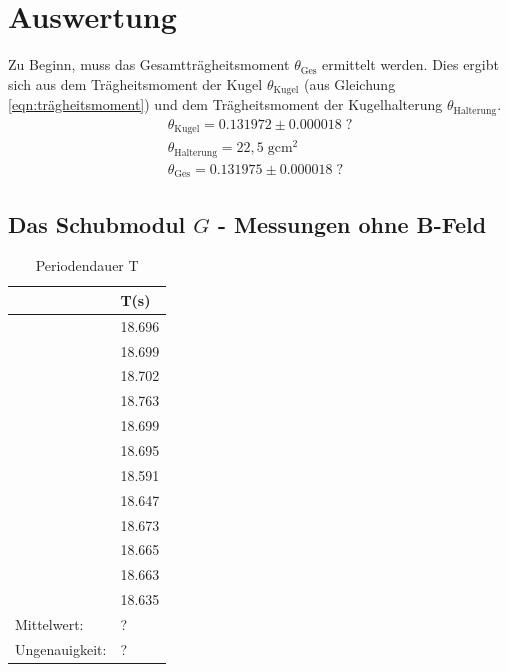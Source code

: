 
\newpage
\section{Auswertung}
Zu Beginn, muss das Gesamtträgheitsmoment $\theta_\text{Ges}$ ermittelt werden.
Dies ergibt sich aus dem Trägheitsmoment der Kugel $\theta_\text{Kugel}$ (aus Gleichung \ref{eqn:trägheitsmoment}) und
dem Trägheitsmoment der Kugelhalterung $\theta_\text{Halterung}$.
\begin{gather}
    \theta_\text{Kugel}=0.131972 \pm 0.000018\;\mathrm{?}\\
    \theta_\text{Halterung}=22,5 \;\mathrm{gcm^2}\\ %
    \theta_\text{Ges}=0.131975 \pm 0.000018 \;\mathrm{?}
\end{gather}

\subsection{Das Schubmodul $G$ - Messungen ohne B-Feld}
\begin{table}
    \centering
    \label{tab:tabelle_1}
    \begin{tabular}{p{3cm} | p{2cm}}
    \toprule
    & T(s) \\
    \midrule
    &18.696\\
    &18.699\\
    &18.702\\
    &18.763\\
    &18.699\\
    &18.695\\
    &18.591\\
    &18.647\\
    &18.673\\
    &18.665\\
    &18.663\\
    &18.635\\
    \midrule
    Mittelwert:     & ? \\
    Ungenauigkeit:     & ? \\
    \bottomrule
    \end{tabular}
    \caption{Periodendauer T}
\end{table}
\newpage
